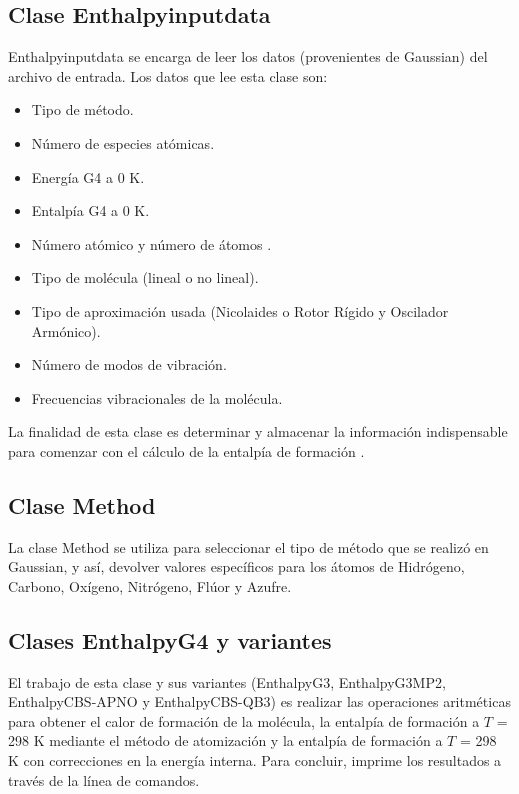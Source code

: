 \subsection*{Clase Enthalpyinputdata}
Enthalpyinputdata se encarga de leer los datos (provenientes de Gaussian) del archivo de entrada. Los datos que lee esta clase son:
\begin{multicols}{2}
\begin{itemize}
	\item Tipo de método.
	\item Número de especies atómicas.
	\item Energía G4 a 0 K.
	\item Entalpía G4 a 0 K.
	\item Número atómico y número de átomos .
	\item Tipo de molécula (lineal o no lineal).
	\item Tipo de aproximación usada (Nicolaides o Rotor Rígido y Oscilador Armónico).
	\item Número de modos de vibración.
	\item Frecuencias vibracionales de la molécula.
\end{itemize}
\end{multicols}
La finalidad de esta clase es determinar y almacenar la información indispensable para comenzar con el cálculo de la entalpía de formación \cite{Pitt2017}. 

\subsection*{Clase Method}
La clase Method se utiliza para seleccionar el tipo de método que se realizó en Gaussian, y así, devolver valores específicos para los átomos de Hidrógeno, Carbono, Oxígeno, Nitrógeno, Flúor y Azufre.

\subsection*{Clases EnthalpyG4 y variantes}
El trabajo de esta clase y sus variantes (EnthalpyG3, EnthalpyG3MP2, EnthalpyCBS-APNO y EnthalpyCBS-QB3) es realizar las operaciones aritméticas para obtener el calor de formación de la molécula, la entalpía de formación a $T$ = 298 K mediante el método de atomización y la entalpía de formación a $T$ = 298 K con correcciones en la energía interna. Para concluir, imprime los resultados a través de la línea de comandos.

\newpage

